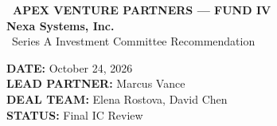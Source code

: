 \documentclass[10pt,a4paper]{article}
\begin{document}
\begin{tcolorbox}[dealbox]
  \begin{minipage}[t]{0.58\textwidth}
    {\color{accent}\small\bfseries\faBuilding\ APEX VENTURE PARTNERS — FUND IV}\\[2pt]
    {\color{primary}\Huge\bfseries Nexa Systems, Inc.}\\[2pt]
    {\color{subtletext}\small\faTag\ Series A Investment Committee Recommendation}
  \end{minipage}%
  \hfill
  \begin{minipage}[t]{0.38\textwidth}
    \raggedleft
    {\color{subtletext}\footnotesize \textbf{DATE:} October 24, 2026}\\[2pt]
    {\color{subtletext}\footnotesize \textbf{LEAD PARTNER:} Marcus Vance}\\[2pt]
    {\color{subtletext}\footnotesize \textbf{DEAL TEAM:} Elena Rostova, David Chen}\\[2pt]
    {\color{subtletext}\footnotesize \textbf{STATUS:} Final IC Review}
  \end{minipage}
\end{tcolorbox}

\vspace{-4pt}
\end{document}
